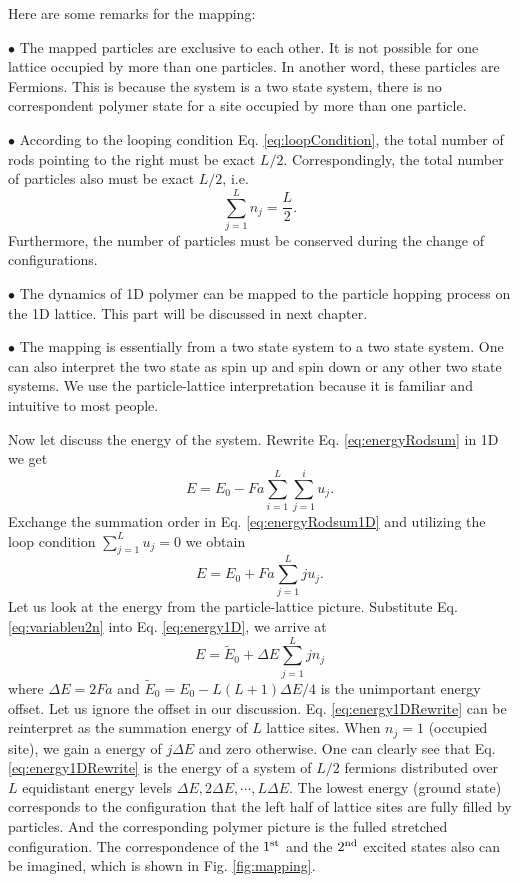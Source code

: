 Here are some remarks for the mapping:

$\bullet$ The mapped particles are exclusive to each other. It is not possible for one lattice occupied by more than one particles. In another word, these particles are Fermions. This is because the system is a two state system, there is no correspondent polymer state for a site occupied by more than one particle.

$\bullet$ According to the looping condition Eq. \eqref{eq:loopCondition}, the total number of rods pointing to the right must be exact $L/2$. Correspondingly, the total number of particles also must be exact $L/2$, i.e.
\begin{equation}
    \label{eq:loopConditionParticle}
    \sum_{j=1}^{L}{n_j} = \frac{L}{2}.
\end{equation}
Furthermore, the number of particles must be conserved during the change of configurations.

$\bullet$ The dynamics of 1D polymer can be mapped to the particle hopping process on the 1D lattice. This part will be discussed in next chapter.

$\bullet$ The mapping is essentially from a two state system to a two state system. One can also interpret the two state as spin up and spin down or any other two state systems. We use the particle-lattice interpretation because it is familiar and intuitive to most people. 

Now let discuss the energy of the system. Rewrite Eq. \eqref{eq:energyRodsum} in 1D we get
\begin{equation}
    \label{eq:energyRodsum1D}
    E = E_0 - Fa \sum_{i=1}^L\sum_{j=1}^i u_j.
\end{equation}
Exchange the summation order in Eq. \eqref{eq:energyRodsum1D} and utilizing the loop condition $\sum_{j=1}^L u_j = 0$ we obtain
\begin{equation}
    \label{eq:energy1D}
    E = E_0 + Fa \sum_{j=1}^L j u_j.
\end{equation}
Let us look at the energy from the particle-lattice picture. Substitute Eq. \eqref{eq:variableu2n} into Eq. \eqref{eq:energy1D}, we arrive at
\begin{equation}
    \label{eq:energy1DRewrite}
    E = \tilde{E}_0+\Delta E\sum_{j=1}^{L} j n_j 
\end{equation}
where $\Delta E = 2Fa$ and $\tilde{E}_0 = E_0 - L(L+1)\Delta E/4$ is the unimportant energy offset. Let us ignore the offset in our discussion. Eq. \eqref{eq:energy1DRewrite} can be reinterpret as the summation energy of $L$ lattice sites. When $n_j = 1$ (occupied site), we gain a energy of $j\Delta E$ and zero otherwise. One can clearly see that Eq. \eqref{eq:energy1DRewrite} is the energy of a system of $L/2$ fermions distributed over $L$ equidistant energy levels $\Delta E, 2\Delta E, \cdots, L\Delta E$.
The lowest energy (ground state) corresponds to the configuration that the left half of lattice sites are fully filled by particles. And the corresponding polymer picture is the fulled stretched configuration. The correspondence of the $1^{\rm{st}}$ and the $2^{\rm{nd}}$ excited states also can be imagined, which is shown in Fig. \ref{fig:mapping}. 

